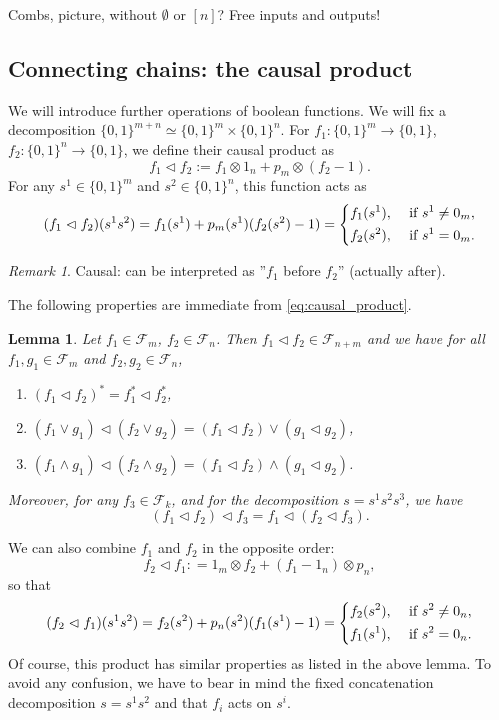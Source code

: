 \documentclass[12pt]{article}
\newtheorem{lemma}{Lemma}
\theoremstyle{definition}
\theoremstyle{remark}
\newtheorem{remark}{Remark}
\def\Fe{\mathcal F}
\def\vtl{\vartriangleleft}
\begin{document}
Combs, picture, without $\emptyset$ or $[n]$? Free inputs and outputs!


\subsection{Connecting chains: the causal product}




We will introduce further operations of boolean functions. 
We will fix a decomposition $\{0,1\}^{m+n}\simeq \{0,1\}^m\times \{0,1\}^n$.
For $f_1:\{0,1\}^m\to \{0,1\}$, $f_2:\{0,1\}^n\to \{0,1\}$, we define their causal product
as 
\[
f_1\vartriangleleft f_2:=f_1\otimes 1_n+p_m\otimes (f_2-1).
\]
For any $s^1\in \{0,1\}^m$ and $s^2\in \{0,1\}^n$, this function acts as
\begin{equation}\label{eq:causal_product}
(f_1\vtl f_2)(s^1s^2)= f_1(s^1)+p_m(s^1)(f_2(s^2)-1)=\begin{dcases} f_1(s^1), & \text{ if } s^1\ne 0_m,\\
   f_2(s^2), & \text{ if } s^1=0_m.
   \end{dcases}
\end{equation}

\begin{remark} Causal: can be interpreted as ''$f_1$ before $f_2$'' (actually after).


\end{remark}

The following properties are immediate from \eqref{eq:causal_product}. 

\begin{lemma}\label{lemma:causal_product}
Let $f_1\in \Fe_m$, $f_2\in \Fe_n$. Then $f_1\vartriangleleft f_2\in \Fe_{n+m}$ and we
have for all $f_1,g_1\in \Fe_m$ and $f_2,g_2\in \Fe_n$,
\begin{enumerate}
\item[(i)] $(f_1\vtl f_2)^*=f_1^*\vtl f_2^*$,
\item[(ii)]$(f_1\vee g_1)\vtl (f_2\vee g_2)=(f_1\vtl f_2)\vee ( g_1\vtl g_2)$,
\item[(iii)] $(f_1\wedge g_1)\vtl (f_2\wedge g_2)=(f_1\vtl f_2)\wedge ( g_1\vtl g_2)$.
\end{enumerate}
Moreover, for any $f_3\in \Fe_k$, and for the decomposition $s=s^1s^2s^3$, we have 
\[
(f_1\vtl f_2)\vtl f_3=f_1\vtl (f_2\vtl f_3).
\]
\end{lemma}



We can also combine $f_1$ and $f_2$ in the opposite order:
\[
f_2\vtl f_1: =1_m\otimes f_2+(f_1-1_n)\otimes p_n,
\]
so that
\begin{equation}\label{eq:causal_product_op}
(f_2\vtl f_1)(s^1s^2)=f_2(s^2)+p_n(s^2)(f_1(s^1)-1)=\begin{dcases} f_2(s^2), & \text{ if }
s^2\ne 0_n,\\
   f_1(s^1), & \text{ if } s^2=0_n.
   \end{dcases}
\end{equation}
Of course, this product has similar properties as listed in the above lemma.
To avoid any confusion, we have to bear in mind the fixed concatenation decomposition $s=s^1s^2$ and
that $f_i$ acts on $s^i$. 
\end{document}
